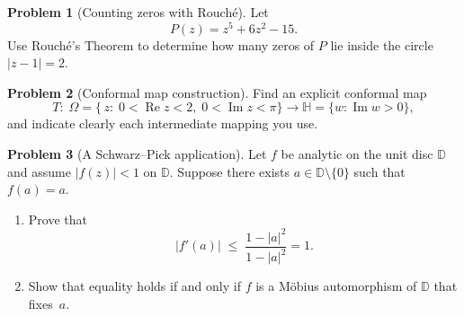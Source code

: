\documentclass[12pt]{article}
\theoremstyle{definition} %
\newtheorem{problem}{Problem}
\theoremstyle{plain} %
\begin{document}
  \pagebreak
  \begin{problem}[Counting zeros with Rouché]
  Let
  \[
    P(z)=z^{5}+6z^{2}-15.
  \]
  Use Rouché’s Theorem to determine how many zeros of $P$ lie inside
  the circle $\lvert z-1\rvert=2$.
  \end{problem}
  
  \pagebreak
  \begin{problem}[Conformal map construction]
  Find an explicit conformal map
  \[
    T:\;
    \Omega=\bigl\{\,z:\;0<\operatorname{Re}z<2,\;0<\operatorname{Im}z<\pi\bigr\}
    \longrightarrow
    \mathbb{H}=\{w:\operatorname{Im}w>0\},
  \]
  and indicate clearly each intermediate mapping you use.
  \end{problem}
  
  \pagebreak
  \begin{problem}[A Schwarz–Pick application]
  Let $f$ be analytic on the unit disc $\mathbb{D}$ and assume $\lvert f(z)\rvert<1$
  on $\mathbb{D}$.  Suppose there exists $a\in\mathbb{D}\setminus\{0\}$ such that
  $f(a)=a$.
  \begin{enumerate}[label=(\alph*),itemsep=6pt]
    \item  Prove that
           \[
             \lvert f'(a)\rvert\;\le\;\frac{1-\lvert a\rvert^{2}}{1-\lvert a\rvert^{2}}
             =1.
           \]
    \item  Show that equality holds if and only if $f$ is a Möbius automorphism
           of $\mathbb{D}$ that fixes $a$.
  \end{enumerate}
  \end{problem}
\end{document}
